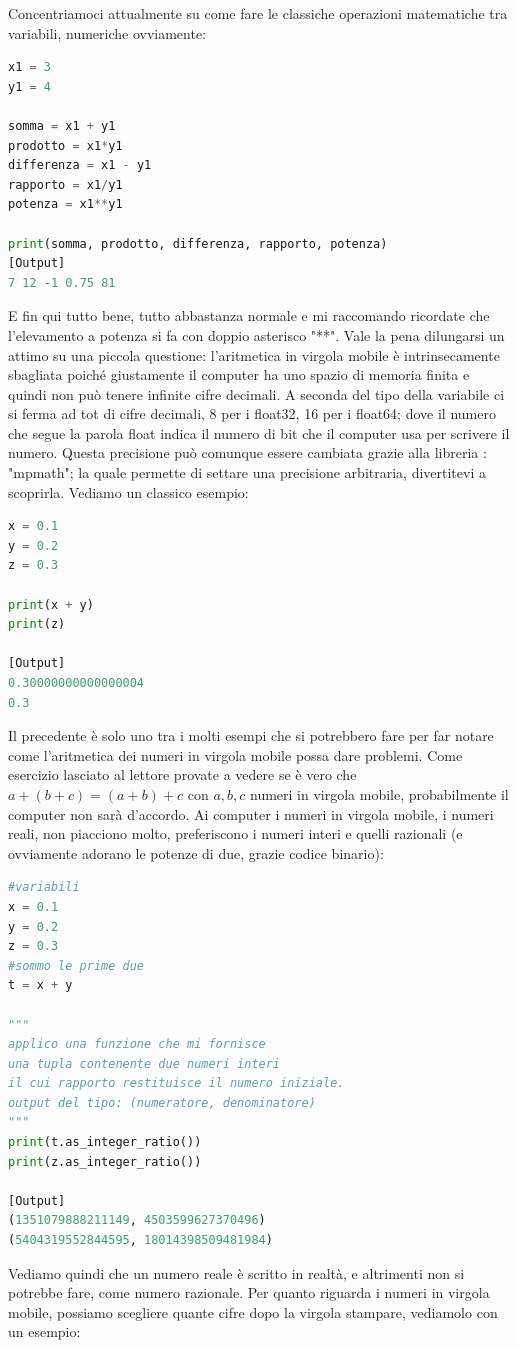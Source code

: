 \documentclass[10pt,a4paper]{article}
\begin{document}
Concentriamoci attualmente su come fare le classiche operazioni matematiche tra variabili, numeriche ovviamente:
\begin{lstlisting}[language=Python]
x1 = 3
y1 = 4

somma = x1 + y1
prodotto = x1*y1
differenza = x1 - y1
rapporto = x1/y1
potenza = x1**y1

print(somma, prodotto, differenza, rapporto, potenza)
[Output]
7 12 -1 0.75 81
\end{lstlisting}
E fin qui tutto bene, tutto abbastanza normale e mi raccomando ricordate che l'elevamento a potenza si fa con doppio asterisco "**".
Vale la pena dilungarsi un attimo su una piccola questione: l'aritmetica in virgola mobile è intrinsecamente sbagliata poiché giustamente il computer ha uno spazio di memoria finita e quindi non può tenere infinite cifre decimali. A seconda del tipo della variabile ci si ferma ad tot di cifre decimali, 8 per i float32, 16 per i float64; dove il numero che segue la parola float indica il numero di bit che il computer usa per scrivere il numero.
Questa precisione può comunque essere cambiata grazie alla libreria : "mpmath"; la quale permette di settare una precisione arbitraria, divertitevi a scoprirla. 
Vediamo un classico esempio:

\begin{lstlisting}[language=Python]
x = 0.1
y = 0.2
z = 0.3

print(x + y)
print(z)

[Output]
0.30000000000000004
0.3
\end{lstlisting}
Il precedente è solo uno tra i molti esempi che si potrebbero fare per far notare come l'aritmetica dei numeri in virgola mobile possa dare problemi. Come esercizio lasciato al lettore provate a vedere se è vero che $a+(b+c) = (a+b)+c$ con $a, b, c$ numeri in virgola mobile, probabilmente il computer non sarà d'accordo.
Ai computer i numeri in virgola mobile, i numeri reali, non piacciono molto, preferiscono i numeri interi e quelli razionali (e ovviamente adorano le potenze di due, grazie codice binario):

\begin{lstlisting}[language=Python]
#variabili
x = 0.1
y = 0.2
z = 0.3
#sommo le prime due
t = x + y

"""
applico una funzione che mi fornisce
una tupla contenente due numeri interi
il cui rapporto restituisce il numero iniziale.
output del tipo: (numeratore, denominatore)
"""
print(t.as_integer_ratio())
print(z.as_integer_ratio())

[Output]
(1351079888211149, 4503599627370496)
(5404319552844595, 18014398509481984)
\end{lstlisting}
Vediamo quindi che un numero reale è scritto in realtà, e altrimenti non si potrebbe fare, come numero razionale.
Per quanto riguarda i numeri in virgola mobile, possiamo scegliere quante cifre dopo la virgola stampare, vediamolo con un esempio:
\end{document}
